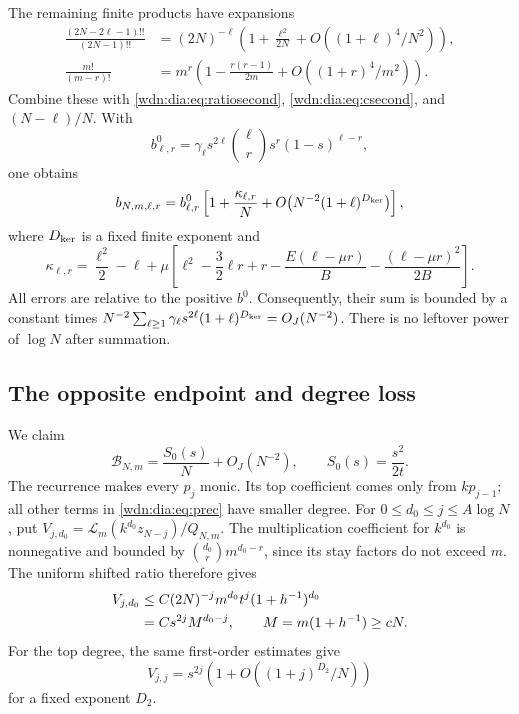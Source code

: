 \documentclass[11pt,letterpaper]{article}
\theoremstyle{remark}\newtheorem{remark}[theorem]{Remark}
\newcommand{\LL}{\mathcal L}
\begin{document}
The remaining finite products have expansions
\begin{align*}
 \frac{(2N-2\ell-1)!!}{(2N-1)!!}
  &=(2N)^{-\ell}\left(1+\frac{\ell^2}{2N}+O((1+\ell)^4/N^2)\right),\\
 \frac{m!}{(m-r)!}
  &=m^r\left(1-\frac{r(r-1)}{2m}+O((1+r)^4/m^2)\right).
\end{align*}
Combine these with \eqref{wdn:dia:eq:ratiosecond}, \eqref{wdn:dia:eq:csecond}, and
$(N-\ell)/N$. With
\[
 b^0_{\ell,r}=\gamma_\ell s^{2\ell}\binom\ell r s^r(1-s)^{\ell-r},
\]
one obtains
\begin{equation}\label{wdn:dia:eq:bsecond}
 b_{N,m,\ell,r}=b^0_{\ell,r}
 \left[1+\frac{\kappa_{\ell,r}}N
 +O\bigl(N^{-2}(1+\ell)^{D_{\rm ker}}\bigr)\right],
\end{equation}
where $D_{\rm ker}$ is a fixed finite exponent and
\begin{equation}\label{wdn:dia:eq:kappa}
 \kappa_{\ell,r}=\frac{\ell^2}{2}-\ell
 +\mu\left[\ell^2-\frac32\ell r+r
 -\frac{E(\ell-\mu r)}B-\frac{(\ell-\mu r)^2}{2B}\right].
\end{equation}
All errors are relative to the positive $b^0$. Consequently, their sum is
bounded by a constant times
$N^{-2}\sum_{\ell\ge1}\gamma_\ell s^{2\ell}(1+\ell)^{D_{\rm ker}}=O_J(N^{-2})$.
There is no leftover power of $\log N$ after summation.

\subsection{The opposite endpoint and degree loss}
We claim
\begin{equation}\label{wdn:dia:eq:Bsecond}
 \mathcal B_{N,m}=\frac{S_0(s)}N+O_J(N^{-2}),\qquad S_0(s)=\frac{s^2}{2t}.
\end{equation}
The recurrence makes every $p_j$ monic. Its top coefficient comes only from
$kp_{j-1}$; all other terms in \eqref{wdn:dia:eq:prec} have smaller degree.
For $0\le d_0\le j\le A\log N$, put
$V_{j,d_0}=\LL_m(k^{d_0}z_{N-j})/Q_{N,m}$. The multiplication coefficient
for $k^{d_0}$ is nonnegative and bounded by
$\binom{d_0}{r}m^{d_0-r}$, since its stay factors do not exceed $m$.
The uniform shifted ratio therefore gives
\begin{align}
 V_{j,d_0}
 &\le C(2N)^{-j}m^{d_0}t^j(1+h^{-1})^{d_0}\notag\\
 &=C s^{2j}M^{d_0-j},\qquad M=m(1+h^{-1})\ge cN.\label{wdn:dia:eq:degreeloss}
\end{align}
For the top degree, the same first-order estimates give
\begin{equation}\label{wdn:dia:eq:topmonomial}
 V_{j,j}=s^{2j}\left(1+O((1+j)^{D_2}/N)\right)
\end{equation}
for a fixed exponent $D_2$.
\end{document}
